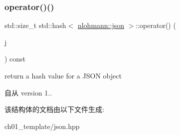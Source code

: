 \subsubsection{\texorpdfstring{operator()()}{operator()()}}
{\footnotesize\ttfamily std\+::size\+\_\+t std\+::hash$<$ \mbox{\hyperlink{namespacenlohmann_a2bfd99e845a2e5cd90aeaf1b1431f474}{nlohmann\+::json}} $>$\+::operator() (\begin{DoxyParamCaption}\item[{const \mbox{\hyperlink{namespacenlohmann_a2bfd99e845a2e5cd90aeaf1b1431f474}{nlohmann\+::json}} \&}]{j }\end{DoxyParamCaption}) const\hspace{0.3cm}{\ttfamily [inline]}}



return a hash value for a J\+S\+ON object 

\begin{DoxySince}{自从}
version 1.. 
\end{DoxySince}


该结构体的文档由以下文件生成\+:\begin{DoxyCompactItemize}
\item 
ch01\+\_\+template/json.\+hpp\end{DoxyCompactItemize}
